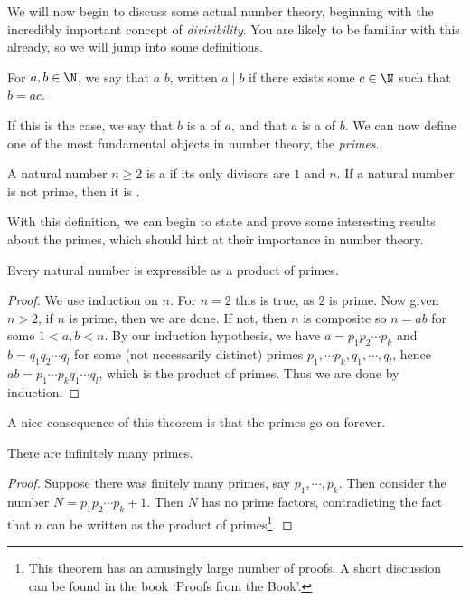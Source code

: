 \documentclass[a4paper]{scrartcl}
\begin{document}
We will now begin to discuss some actual number theory, beginning with the incredibly important concept of \emph{divisibility}. You are likely to be familiar with this already, so we will jump into some definitions.

\begin{definition}[Divisibility]
	For $a, b \in \N$, we say that $a$  $b$, written $a \mid b$ if there exists some $c \in \N$ such that $b = ac$.
\end{definition}

If this is the case, we say that $b$ is a  of $a$, and that $a$ is a  of $b$. We can now define one of the most fundamental objects in number theory, the \emph{primes}.

\begin{definition}[Primes]
	A natural number $n \geq 2$ is a  if its only divisors are $1$ and $n$. If a natural number is not prime, then it is .
\end{definition}

With this definition, we can begin to state and prove some interesting results about the primes, which should hint at their importance in number theory.

\begin{theorem}\label{thm:product-primes}
	Every natural number is expressible as a product of primes.
\end{theorem}
\begin{proof}
	We use induction on $n$. For $n = 2$ this is true, as $2$ is prime. Now given $n > 2$, if $n$ is prime, then we are done. If not, then $n$ is composite so $n = ab$ for some $1 < a, b < n$. By our induction hypothesis, we have $a = p_1 p_2 \cdots p_k$ and $b = q_1 q_2 \cdots q_l$ for some (not necessarily distinct) primes $p_1, \cdots p_k, q_1, \cdots, q_l$, hence $ab = p_1 \cdots p_k q_1 \cdots q_l$, which is the product of primes. Thus we are done by induction.
\end{proof}

A nice consequence of this theorem is that the primes go on forever.

\begin{theorem}[Euclid]
	There are infinitely many primes.
\end{theorem}
\begin{proof}
	Suppose there was finitely many primes, say $p_1, \cdots, p_k$. Then consider the number $N = p_1 p_2 \cdots p_k + 1$. Then $N$ has no prime factors, contradicting the fact that $n$ can be written as the product of primes\footnote{This theorem has an amusingly large number of proofs. A short discussion can be found in the book `Proofs from the Book'.}.
\end{proof}
\end{document}
